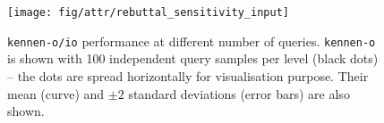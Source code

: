 \documentclass{article} %
\newcommand{\OR}{\texttt{kennen-o}\xspace}
\begin{document}
\begin{figure}
\vspace{0em}
\begin{centering}
\setlength{\tabcolsep}{1em}
\texttt{[image: fig/attr/rebuttal\_sensitivity\_input]}
\par\end{centering}
\vspace{0em}
\caption{\label{fig:influence-query-sample} \texttt{kennen-o/io} performance at different number of queries. \OR is shown with 100 independent query samples per level (black dots) -- the dots are spread horizontally for visualisation purpose. Their mean (curve) and $\pm 2$ standard deviations (error bars) are also shown.}
\vspace{0em}
\end{figure}
\end{document}
